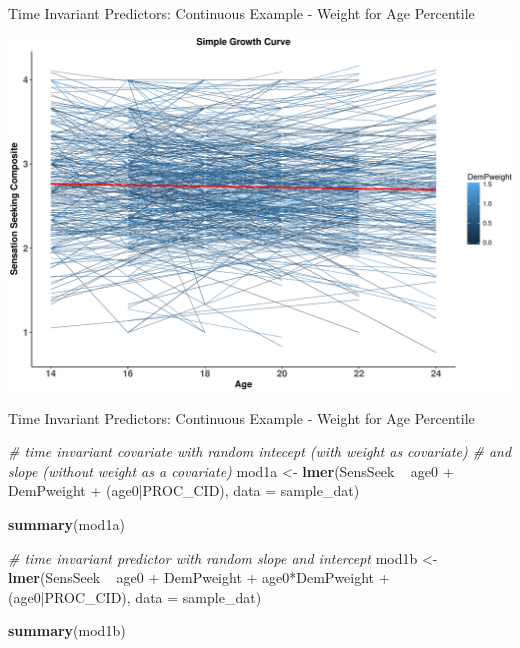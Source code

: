 \documentclass[ignorenonframetext,]{beamer}
\newenvironment{Shaded}{\begin{snugshade}}{\end{snugshade}}
\newcommand{\KeywordTok}[1]{\textcolor[rgb]{0.13,0.29,0.53}{\textbf{{#1}}}}
\newcommand{\DataTypeTok}[1]{\textcolor[rgb]{0.13,0.29,0.53}{{#1}}}
\newcommand{\StringTok}[1]{\textcolor[rgb]{0.31,0.60,0.02}{{#1}}}
\newcommand{\CommentTok}[1]{\textcolor[rgb]{0.56,0.35,0.01}{\textit{{#1}}}}
\newcommand{\NormalTok}[1]{{#1}}
\begin{document}
\begin{frame}{Time Invariant Predictors: Continuous Example - Weight for
Age Percentile}

\includegraphics{Conditional_Models_files/figure-beamer/unnamed-chunk-8-1.pdf}

\end{frame}

\begin{frame}[fragile]{Time Invariant Predictors: Continuous Example -
Weight for Age Percentile}

\tiny

\begin{Shaded}
\begin{Highlighting}[]
\CommentTok{# time invariant covariate with random intecept (with weight as covariate) }
\CommentTok{# and slope (without weight as a covariate)}
\NormalTok{mod1a <-}\StringTok{ }\KeywordTok{lmer}\NormalTok{(SensSeek ~}\StringTok{ }\NormalTok{age0 +}\StringTok{ }\NormalTok{DemPweight +}\StringTok{ }\NormalTok{(age0|PROC_CID), }
              \DataTypeTok{data =} \NormalTok{sample_dat)}

\KeywordTok{summary}\NormalTok{(mod1a)}

\CommentTok{# time invariant predictor with random slope and intercept}
\NormalTok{mod1b <-}\StringTok{ }\KeywordTok{lmer}\NormalTok{(SensSeek ~}\StringTok{ }\NormalTok{age0 +}\StringTok{ }\NormalTok{DemPweight +}\StringTok{ }\NormalTok{age0*DemPweight +}\StringTok{ }
\StringTok{                }\NormalTok{(age0|PROC_CID), }\DataTypeTok{data =} \NormalTok{sample_dat)}

\KeywordTok{summary}\NormalTok{(mod1b)}
\end{Highlighting}
\end{Shaded}

\normalsize

\end{frame}
\end{document}
